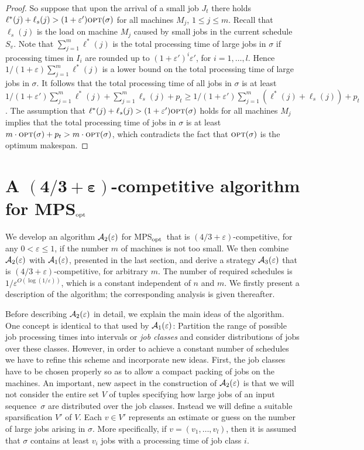 \documentclass{llncs}
\newcommand{\OPT}{\text{{\sc opt}}}
\newcommand{\opt}{\OPT}
\newcommand{\MPSO}{{\rm MPS$_{\rm opt}$}}
\newcommand{\eps}{\varepsilon}
\begin{document}
\begin{proof}
So suppose that upon the arrival of a small job $J_t$ there holds $\ell^*(j) + \ell_s(j) > (1+\eps')\opt(\sigma)$
for all machines $M_j$, $1\leq j \leq m$. Recall that $\ell_s(j)$ is the load on machine $M_j$ caused by small
jobs in the current schedule $S_v$. Note that $\sum_{j=1}^m \ell^*(j)$ is the total processing time of large jobs
in $\sigma$ if processing times in $I_i$ are rounded up to $(1+\eps')^i\eps'$, for $i=1, \ldots, l$. 
Hence $1/(1+\eps)\sum_{j=1}^m \ell^*(j)$ is a lower bound on the total processing time of large jobs in $\sigma$.
It follows that the total processing time of all jobs in $\sigma$ is at least
$1/(1+\eps') \sum_{j=1}^m \ell^*(j) + \sum_{j=1}^m \ell_s(j) +p_t \geq 
1/(1+\eps') \sum_{j=1}^m (\ell^*(j) + \ell_s(j)) +p_t$. The assumption that 
$\ell^*(j) + \ell_s(j) > (1+\eps')\opt(\sigma)$ holds for all machines $M_j$ implies that
the total processing time of jobs in $\sigma$ is at least $m\cdot \opt(\sigma) + p_t > m\cdot \opt(\sigma)$, 
which contradicts the fact that $\opt(\sigma)$ is the optimum makespan.  \hspace*{\fill}{$\Box$}
\end{proof}



\section{A {$\mathbf{(4/3+\eps)}$}-competitive algorithm for \MPSO}\label{sec:4/3}

We develop an algorithm  ${\cal A}_2(\eps)$ for \MPSO\ that is $(4/3+\eps)$-competitive, for any $0<\eps \leq 1$, if
the number $m$ of machines is not too small. We then combine ${\cal A}_2(\eps)$ with ${\cal A}_1(\eps)$,
presented in the last section, and derive a strategy ${\cal A}_3(\eps)$ that is $(4/3+\eps)$-competitive,
for arbitrary $m$. The number of required schedules is $1/\eps^{O(\log (1/\eps))}$, which is a constant independent of
$n$ and $m$. We firstly present a description of the algorithm; the corresponding analysis is given thereafter.

Before describing ${\cal A}_2(\eps)$ in detail, we explain the main ideas of the algorithm. One concept
is identical to that used by ${\cal A}_1(\eps)$: Partition the range of possible job processing times into
intervals or {\em job classes\/} and consider distributions of jobs over these classes. However, in order
to achieve a constant number of schedules we have to refine this scheme and incorporate new
ideas. First, the job classes have to be chosen properly so as to allow a compact packing of jobs on the machines.
An important, new aspect in the construction of ${\cal A}_2(\eps)$ is that we will not consider 
the entire set $V$ of tuples specifying how large jobs of an input sequence~$\sigma$ are distributed over 
the job classes. Instead we will define a suitable sparsification $V'$ of $V$. Each $v\in V'$ represents 
an estimate or guess on the number of large jobs arising in $\sigma$. More specifically, if 
$v=(v_1, \ldots, v_l)$, then it is assumed that $\sigma$ contains at least $v_i$ jobs with a processing
time of job class $i$. 
\end{document}
